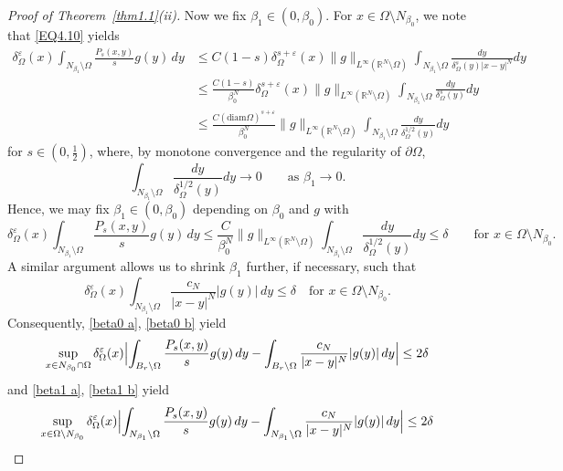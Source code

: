 \documentclass[notitlepage,11pt,reqno]{amsart}
\theoremstyle{definition}
\numberwithin{equation}{section}
\newcommand{\eps}{{\varepsilon}}
\newcommand{\R}{\mathds{R}}
\begin{document}
\begin{proof}[Proof of Theorem~\ref{thm1.1}(ii)]
Now we fix $\beta_1 \in (0,\beta_0)$. For $x \in \Omega \setminus N_{\beta_0}$, we note that \eqref{EQ4.10} yields
\begin{align*}
 \delta^{\varepsilon}_{\Omega}(x) \int_{N_{\beta_1} \setminus \Omega}\frac{P_s(x, y)}{s}g(y)\, dy
  &\leq C(1-s)\delta^{s+\varepsilon}_{\Omega}(x) \|g\|_{L^{\infty}(\R^N \setminus \Omega)}\int_{N_{\beta_1}\setminus \Omega}\frac{dy}{\delta^s_{\Omega}(y)|x-y|^N}dy\\
  &\leq \frac{C(1-s)}{\beta_0^N} \delta^{s+\varepsilon}_{\Omega}(x) \|g\|_{L^{\infty}(\R^N \setminus \Omega)} \int_{N_{\beta_1}\setminus \Omega}\frac{dy}{\delta^s_{\Omega}(y)}dy\\
    &\leq \frac{C (\text{diam}\Omega)^{s+\eps}}{\beta_0^N} \|g\|_{L^{\infty}(\R^N \setminus \Omega)} \int_{N_{\beta_1}\setminus \Omega}\frac{dy}{\delta^{1/2}_{\Omega}(y)}dy 
\end{align*}
for $s \in (0,\frac{1}{2})$, where, by monotone convergence and the regularity of $\partial \Omega$,  
$$
\int_{N_{\beta_1}\setminus \Omega}\frac{dy}{\delta^{1/2}_{\Omega}(y)}dy \to 0 \qquad \text{as $\beta_1 \to 0$.}
$$
Hence, we may fix $\beta_1 \in (0,\beta_0)$ depending on $\beta_0$ and $g$ with  
\begin{equation}\label{beta1 a}
\delta^{\varepsilon}_{\Omega}(x) \int_{N_{\beta_1} \setminus \Omega}\frac{P_s(x, y)}{s}g(y)\, dy\le  \frac{C}{\beta_0^N} \|g\|_{L^{\infty}(\R^N \setminus \Omega)} \int_{N_{\beta_1}\setminus \Omega}\frac{dy}{\delta^{1/2}_{\Omega}(y)}dy \le \delta \qquad \text{for $x \in \Omega \setminus N_{\beta_0}$.}
\end{equation}
A similar argument allows us to shrink $\beta_1$ further, if necessary, such that
\begin{equation}\label{beta1 b}
\delta^{\varepsilon}_{\Omega}(x) \int_{N_{\beta_1} \setminus \Omega}\frac{c_N}{|x-y|^N}|g(y)|\, dy \le \delta \quad \text{for $x \in \Omega \setminus N_{\beta_0}.$} 
\end{equation}
Consequently, \eqref{beta0 a}, \eqref{beta0 b} yield
\begin{equation}
  \label{eq:delta-diff-est-1}
\sup_{x \in N_{\beta_0} \cap \Omega} \delta^\eps_\Omega(x) \Bigl|\int_{B_r \setminus \Omega}\frac{P_s(x, y)}{s}g(y)\, dy- \int_{B_r \setminus \Omega}\frac{c_N}{|x-y|^N}|g(y)|\, dy\Bigr| \le 2 \delta
\end{equation}
and \eqref{beta1 a}, \eqref{beta1 b} yield
\begin{equation}
  \label{eq:delta-diff-est-2}
\sup_{x \in \Omega \setminus N_{\beta_0}} \delta^\eps_\Omega(x) \Bigl|\int_{N_{\beta_1} \setminus \Omega}\frac{P_s(x, y)}{s}g(y)\, dy- \int_{N_{\beta_1} \setminus \Omega}\frac{c_N}{|x-y|^N}|g(y)|\, dy\Bigr| \le 2 \delta

\end{equation}
\end{proof}
\end{document}
